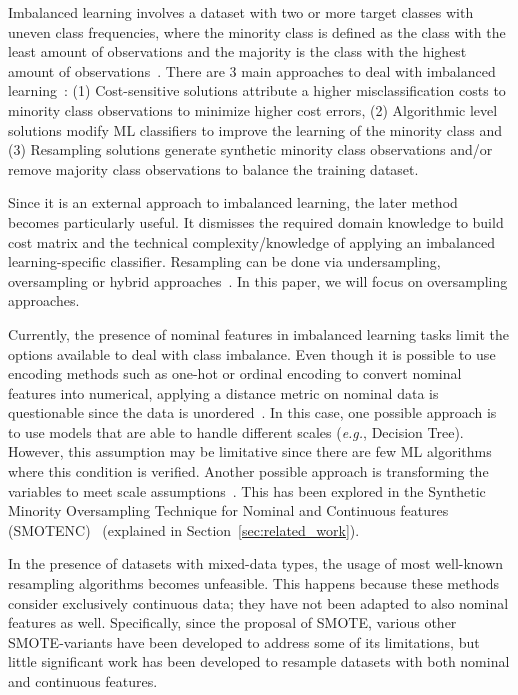 \documentclass[parskip=full]{scrartcl}
\begin{document}
Imbalanced learning involves a dataset with two or more target classes with
uneven class frequencies, where the minority class is defined as the class
with the least amount of observations and the majority is the class with the
highest amount of observations~\cite{kaur2019systematic}. There are 3 main
approaches to deal with imbalanced learning~\cite{fernandez2013analysing}: (1)
Cost-sensitive solutions attribute a higher misclassification costs to
minority class observations to minimize higher cost errors, (2) Algorithmic
level solutions modify ML classifiers to improve the learning of the minority
class and (3) Resampling solutions generate synthetic minority class
observations and/or remove majority class observations to balance the training
dataset.

Since it is an external approach to imbalanced learning, the later method
becomes particularly useful. It dismisses the required domain knowledge to
build cost matrix and the technical complexity/knowledge of applying an
imbalanced learning-specific classifier. Resampling can be done via
undersampling, oversampling or hybrid approaches~\cite{tarekegn2021review}. In
this paper, we will focus on oversampling approaches.

Currently, the presence of nominal features in imbalanced learning tasks limit
the options available to deal with class imbalance. Even though it is possible
to use encoding methods such as one-hot or ordinal encoding to convert nominal
features into numerical, applying a distance metric on nominal data is
questionable since the data is unordered~\cite{lumijarvi2004comparison}. In
this case, one possible approach is to use models that are able to handle
different scales (\textit{e.g.}, Decision Tree). However, this assumption may
be limitative since there are few ML algorithms where this condition is
verified. Another possible approach is transforming the variables to meet
scale assumptions~\cite{lumijarvi2004comparison}. This has been
explored in the Synthetic Minority Oversampling Technique for Nominal and
Continuous features (SMOTENC)~\cite{Chawla2002} (explained in
Section~\ref{sec:related_work}).

In the presence of datasets with mixed-data types, the usage of most
well-known resampling algorithms becomes unfeasible. This happens because
these methods consider exclusively continuous data; they have not been adapted
to also nominal features as well. Specifically, since the proposal of SMOTE,
various other SMOTE-variants have been developed to address some of its
limitations, but little significant work has been developed to resample
datasets with both nominal and continuous features. 
\end{document}
